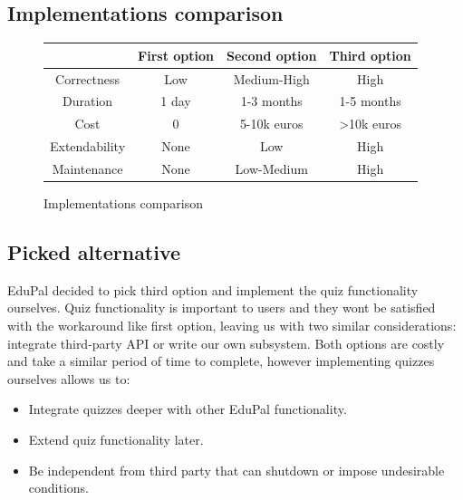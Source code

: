 \documentclass[
    english, %
]{VUMIFPSkursinis}
\begin{document}
\subsection{Implementations comparison}

\begin{figure}[ht]
    \centering
    \begin{tabular}{|c|c|c|c|}
        \hline
                                & First option & Second option & Third option \\
        \hline
        Correctness             & Low         &Medium-High         &  High            \\
        \hline
        Duration                & 1 day        & 1-3 months     & 1-5 months   \\
        \hline
        Cost                    & 0            & 5-10k euros   & >10k euros   \\
        \hline
        Extendability           & None      & Low    & High    \\
        \hline
        Maintenance             & None          & Low-Medium           & High          \\
        \hline
    \end{tabular}
    \caption{Implementations comparison}
    \label{tab:implementations-comparison}
\end{figure}

\subsection{Picked alternative}

EduPal decided to pick third option and implement the quiz functionality ourselves. Quiz functionality is important to users and they wont be satisfied with the workaround like first option, leaving us with two similar considerations: integrate third-party API or write our own subsystem. Both options are costly and take a similar period of time to complete, however implementing quizzes ourselves allows us to:

\begin{itemize}
    \item Integrate quizzes deeper with other EduPal functionality.
    \item Extend quiz functionality later.
    \item Be independent from third party that can shutdown or impose undesirable conditions.
\end{itemize}
\end{document}
